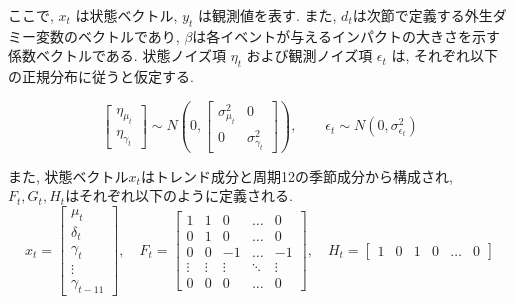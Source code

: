 \documentclass[a4paper, 10pt]{jarticle}
\begin{document}
ここで, $x_{t}$ は状態ベクトル, $y_{t}$ は観測値を表す. 
また, $d_t$は次節で定義する外生ダミー変数のベクトルであり, $\beta$は各イベントが与えるインパクトの大きさを示す係数ベクトルである. 
状態ノイズ項 $\eta_t$ および観測ノイズ項 $\epsilon_t$ は, それぞれ以下の正規分布に従うと仮定する. 

\begin{equation}
    \begin{bmatrix}
        \eta_{\mu_{t}}  \\
        \eta_{\gamma_{t}}
    \end{bmatrix}
    \sim N \left( 0, 
    \begin{bmatrix}
        \sigma_{\mu_{t}}^2 & 0  \\
        0 & \sigma_{\gamma_{t}}^2
    \end{bmatrix} \right)
    ,
    \qquad %
    \epsilon_t \sim N( 0, \sigma_{\epsilon_{t}}^2)
    \label{eq:dist_combined} %
\end{equation}

また, 状態ベクトル$x_t$はトレンド成分と周期12の季節成分から構成され, $F_t, G_t, H_t$はそれぞれ以下のように定義される.
\begin{equation}
    x_t = 
    \begin{bmatrix}
        \mu_t \\
        \delta_t \\
        \gamma_t \\
        \vdots \\
        \gamma_{t-11}
    \end{bmatrix}
    , \quad
    F_t = 
    \begin{bmatrix}
        1 & 1 & 0 & \dots & 0 \\
        0 & 1 & 0 & \dots & 0 \\
        0 & 0 & -1 & \dots & -1 \\
        \vdots & \vdots & \vdots & \ddots & \vdots \\
        0 & 0 & 0 & \dots & 0
    \end{bmatrix}
    , \quad
    H_t = 
    \begin{bmatrix}
        1 & 0 & 1 & 0 & \dots & 0
    \end{bmatrix}
\end{equation}
\end{document}
